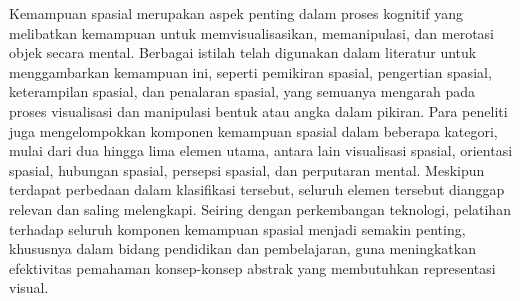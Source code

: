 \documentclass[12pt]{article}
\begin{document}
\begin{enumerate}
    \hspace*{1cm}Kemampuan spasial merupakan aspek penting dalam proses kognitif yang melibatkan kemampuan untuk memvisualisasikan, memanipulasi, dan merotasi objek secara mental. Berbagai istilah telah digunakan dalam literatur untuk menggambarkan kemampuan ini, seperti pemikiran spasial, pengertian spasial, keterampilan spasial, dan penalaran spasial, yang semuanya mengarah pada proses visualisasi dan manipulasi bentuk atau angka dalam pikiran. Para peneliti juga mengelompokkan komponen kemampuan spasial dalam beberapa kategori, mulai dari dua hingga lima elemen utama, antara lain visualisasi spasial, orientasi spasial, hubungan spasial, persepsi spasial, dan perputaran mental. Meskipun terdapat perbedaan dalam klasifikasi tersebut, seluruh elemen tersebut dianggap relevan dan saling melengkapi. Seiring dengan perkembangan teknologi, pelatihan terhadap seluruh komponen kemampuan spasial menjadi semakin penting, khususnya dalam bidang pendidikan dan pembelajaran, guna meningkatkan efektivitas pemahaman konsep-konsep abstrak yang membutuhkan representasi visual.


\end{enumerate}
\end{document}
